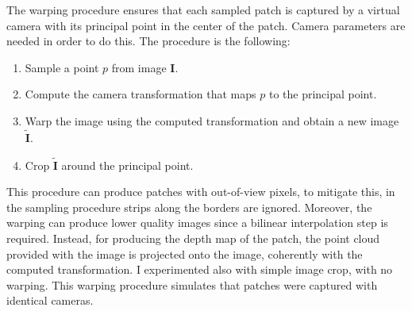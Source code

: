 The warping procedure ensures that each sampled patch is captured by a virtual camera with its principal point in the center of the patch.
Camera parameters are needed in order to do this.
The procedure is the following:
\begin{enumerate}
    \item{Sample a point $p$ from image $\mathbf{I}$.}
    \item{Compute the camera transformation that maps $p$ to the principal point.}
    \item{Warp the image using the computed transformation and obtain a new image $\tilde{\mathbf{I}}$.}
    \item{Crop $\tilde{\mathbf{I}}$ around the principal point.}
\end{enumerate}
This procedure can produce patches with out-of-view pixels, to mitigate this, in the sampling procedure strips along the borders are ignored.
Moreover, the warping can produce lower quality images since a bilinear interpolation step is required.
Instead, for producing the depth map of the patch, the point cloud provided with the image is projected onto the image, coherently with the computed transformation.
I experimented also with simple image crop, with no warping.
This warping procedure simulates that patches were captured with identical cameras.

